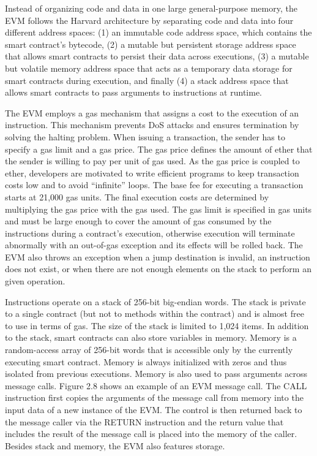         
        Instead of organizing code and data in one large general-purpose memory, the EVM follows the Harvard architecture by separating code and data into four different address spaces: (1) an immutable code address space, which contains the smart contract's bytecode, (2) a mutable but persistent storage address space that allows smart contracts to persist their data across executions, (3) a mutable but volatile memory address space that acts as a temporary data storage for smart contracts during execution, and finally (4) a stack address space that allows smart contracts to pass arguments to instructions at runtime.

        The EVM employs a gas mechanism that assigns a cost to the execution of an instruction.
        This mechanism prevents DoS attacks and ensures termination by solving the halting problem.
        When issuing a transaction, the sender has to specify a gas limit and a gas price.
        The gas price defines the amount of ether that the sender is willing to pay per unit of gas used.
        As the gas price is coupled to ether, developers are motivated to write efficient programs to keep transaction costs low and to avoid “infinite” loops.
        The base fee for executing a transaction starts at 21,000 gas units.
        The final execution costs are determined by multiplying the gas price with the gas used.
        The gas limit is specified in gas units and must be large enough to cover the amount of gas consumed by the instructions during a contract's execution, otherwise execution will terminate abnormally with an out-of-gas exception and its effects will be rolled back.
        The EVM also throws an exception when a jump destination is invalid, an instruction does not exist, or when there are not enough elements on the stack to perform an given operation.

        Instructions operate on a stack of 256-bit big-endian words.
        The stack is private to a single contract (but not to methods within the contract) and is almost free to use in terms of gas.
        The size of the stack is limited to 1,024 items.
        In addition to the stack, smart contracts can also store variables in memory.
        Memory is a random-access array of 256-bit words that is accessible only by the currently executing smart contract.
        Memory is always initialized with zeros and thus isolated from previous executions.
        Memory is also used to pass arguments across message calls.
        Figure 2.8 shows an example of an EVM message call.
        The CALL instruction first copies the arguments of the message call from memory into the input data of a new instance of the EVM.
        The control is then returned back to the message caller via the RETURN instruction and the return value that includes the result of the message call is placed into the memory of the caller.
        Besides stack and memory, the EVM also features storage.

